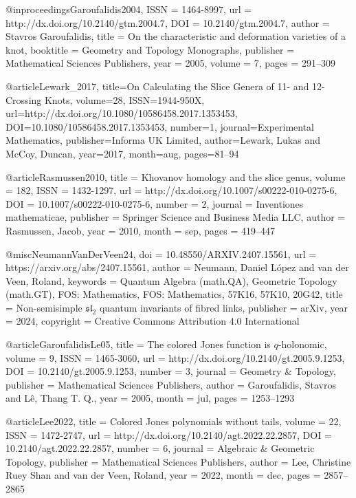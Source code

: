 @inproceedings{Garoufalidis2004,
  ISSN = {1464-8997},
  url = {http://dx.doi.org/10.2140/gtm.2004.7},
  DOI = {10.2140/gtm.2004.7},
  author = {Stavros Garoufalidis},
  title = {On the characteristic and deformation varieties of a knot}, 
  booktitle = {Geometry and Topology Monographs},
  publisher = {Mathematical Sciences Publishers},
  year = {2005},
  volume = 7,
  pages = {291--309}
}

@article{Lewark_2017,
  title={On Calculating the Slice Genera of 11- and 12-Crossing Knots},
  volume={28},
  ISSN={1944-950X},
  url={http://dx.doi.org/10.1080/10586458.2017.1353453},
  DOI={10.1080/10586458.2017.1353453},
  number={1},
  journal={Experimental Mathematics},
  publisher={Informa UK Limited},
  author={Lewark, Lukas and McCoy, Duncan},
  year={2017},
  month=aug, pages={81--94} 
}

@article{Rasmussen2010,
  title = {Khovanov homology and the slice genus},
  volume = {182},
  ISSN = {1432-1297},
  url = {http://dx.doi.org/10.1007/s00222-010-0275-6},
  DOI = {10.1007/s00222-010-0275-6},
  number = {2},
  journal = {Inventiones mathematicae},
  publisher = {Springer Science and Business Media LLC},
  author = {Rasmussen,  Jacob},
  year = {2010},
  month = sep,
  pages = {419--447}
}

@misc{NeumannVanDerVeen24,
  doi = {10.48550/ARXIV.2407.15561},
  url = {https://arxiv.org/abs/2407.15561},
  author = {Neumann,  Daniel López and van der Veen,  Roland},
  keywords = {Quantum Algebra (math.QA),  Geometric Topology (math.GT),  FOS: Mathematics,  FOS: Mathematics,  57K16,  57K10,  20G42},
  title = {Non-semisimple $\mathfrak{sl}_2$ quantum invariants of fibred links},
  publisher = {arXiv},
  year = {2024},
  copyright = {Creative Commons Attribution 4.0 International}
}


@article{GaroufalidisLe05,
  title = {The colored {Jones} function is $q$-holonomic},
  volume = {9},
  ISSN = {1465-3060},
  url = {http://dx.doi.org/10.2140/gt.2005.9.1253},
  DOI = {10.2140/gt.2005.9.1253},
  number = {3},
  journal = {Geometry \& Topology},
  publisher = {Mathematical Sciences Publishers},
  author = {Garoufalidis,  Stavros and L\^e,  Thang T. Q.},
  year = {2005},
  month = jul,
  pages = {1253--1293}
}

@article{Lee2022,
  title = {Colored {Jones} polynomials without tails},
  volume = {22},
  ISSN = {1472-2747},
  url = {http://dx.doi.org/10.2140/agt.2022.22.2857},
  DOI = {10.2140/agt.2022.22.2857},
  number = {6},
  journal = {Algebraic \& Geometric Topology},
  publisher = {Mathematical Sciences Publishers},
  author = {Lee,  Christine Ruey Shan and van der Veen,  Roland},
  year = {2022},
  month = dec,
  pages = {2857--2865}
}

